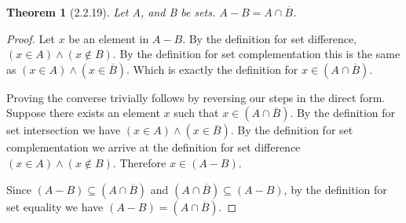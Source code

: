 \documentclass[a4paper, 12pt]{article}
\theoremstyle{plain}
\newtheorem*{theorem*}{Theorem}
\begin{document}
	
	\begin{theorem*}[2.2.19]
		Let A, and B be sets. $A - B = A \cap \overline{B}$.
	\end{theorem*}
	
	\begin{proof}
		Let $x$ be an element in $A - B$. By the definition for set difference, 
		$(x \in A) \land (x \notin B)$. By the definition for set complementation this is the 
		same as $(x \in A) \land (x \in \overline{B})$. Which is exactly the definition for 
		$x \in (A \cap \overline{B})$.
		
		Proving the converse trivially follows by reversing our steps in the direct form. Suppose 
		there exists an element $x$ such that $x \in (A \cap \overline{B})$. By the definition for 
		set intersection we have $(x \in A) \land (x \in \overline{B})$. By the definition for set 
		complementation we arrive at the definition for set difference \newline 
		$(x \in A) \land (x \notin B)$. Therefore $x \in (A - B)$.
		
		Since $(A - B) \subseteq (A \cap \overline{B})$ and $(A \cap \overline{B}) \subseteq (A - B)$, 
		by the definition for set equality we have $(A - B) = (A \cap \overline{B})$.
	\end{proof}
\end{document}
